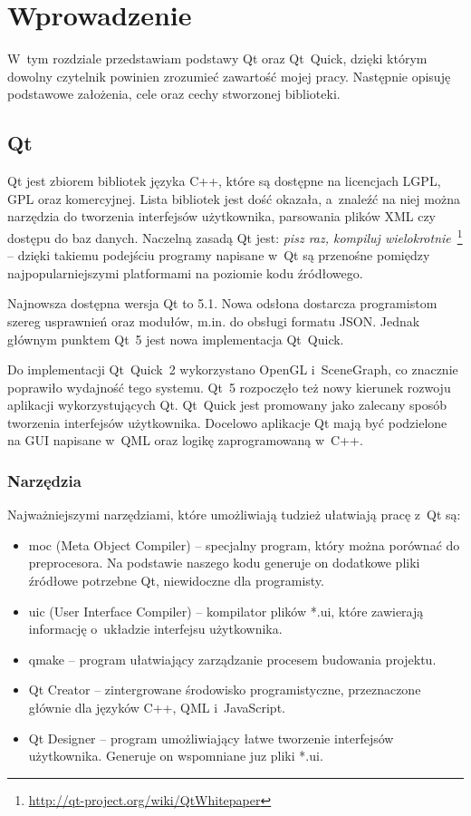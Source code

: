 \chapter{Wprowadzenie}
W~tym rozdziale przedstawiam podstawy Qt oraz Qt~Quick, dzięki którym dowolny czytelnik powinien zrozumieć zawartość mojej pracy. Następnie opisuję podstawowe założenia, cele oraz cechy stworzonej biblioteki.

\section{Qt}
Qt jest zbiorem bibliotek języka C++, które są dostępne na licencjach LGPL, GPL oraz komercyjnej. Lista bibliotek jest dość okazała, a~znaleźć na niej można narzędzia do tworzenia interfejsów użytkownika, parsowania plików XML czy dostępu do baz danych. Naczelną zasadą Qt jest: \textit{pisz raz, kompiluj wielokrotnie}~\footnote{\url{http://qt-project.org/wiki/QtWhitepaper}} -- dzięki takiemu podejściu programy napisane w~Qt są przenośne pomiędzy najpopularniejszymi platformami na poziomie kodu źródłowego.  

Najnowsza dostępna wersja Qt to 5.1. Nowa odsłona dostarcza programistom szereg usprawnień oraz modułów, m.in. do obsługi formatu JSON. Jednak głównym punktem Qt~5 jest nowa implementacja Qt~Quick. 

Do implementacji Qt~Quick~2 wykorzystano OpenGL i~SceneGraph, co znacznie poprawiło wydajność tego systemu. Qt~5 rozpoczęło też nowy kierunek rozwoju aplikacji wykorzystujących Qt. Qt~Quick jest promowany jako zalecany sposób tworzenia interfejsów użytkownika. Docelowo aplikacje Qt mają być podzielone na GUI napisane w~QML oraz logikę zaprogramowaną w~C++.

\subsection{Narzędzia}
Najważniejszymi narzędziami, które umożliwiają tudzież ułatwiają pracę z~Qt są:
\begin{itemize}
\item moc (Meta Object Compiler) -- specjalny program, który można porównać do preprocesora. Na podstawie naszego kodu generuje on dodatkowe pliki źródłowe potrzebne Qt, niewidoczne dla programisty.
\item uic (User Interface Compiler) -- kompilator plików *.ui, które zawierają informację o~układzie interfejsu użytkownika.
\item qmake -- program ułatwiający zarządzanie procesem budowania projektu.
\item Qt Creator -- zintergrowane środowisko programistyczne, przeznaczone głównie dla języków C++, QML i~JavaScript.
\item Qt Designer -- program umożliwiający łatwe tworzenie interfejsów użytkownika. Generuje on wspomniane juz pliki *.ui.
\end{itemize}


